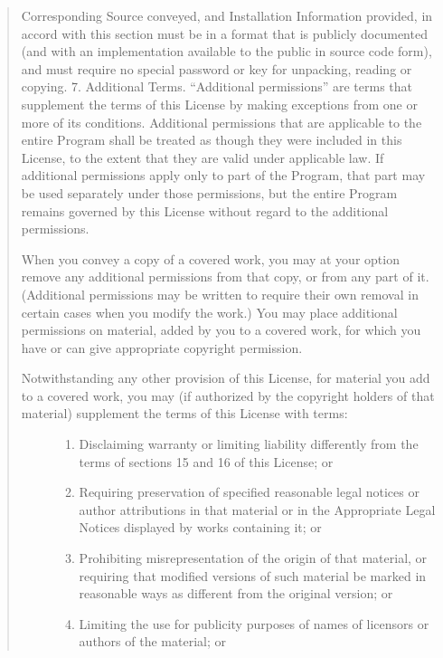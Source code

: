 \documentclass[letterpaper,10pt,english]{sphinxmanual}
\begin{document}
\begin{quote}
Corresponding Source conveyed, and Installation Information provided, in accord with this section must be in a format that is publicly documented (and with an implementation available to the public in source code form), and must require no special password or key for unpacking, reading or copying.
7. Additional Terms.
“Additional permissions” are terms that supplement the terms of this License by making exceptions from one or more of its conditions. Additional permissions that are applicable to the entire Program shall be treated as though they were included in this License, to the extent that they are valid under applicable law. If additional permissions apply only to part of the Program, that part may be used separately under those permissions, but the entire Program remains governed by this License without regard to the additional permissions.

When you convey a copy of a covered work, you may at your option remove any additional permissions from that copy, or from any part of it. (Additional permissions may be written to require their own removal in certain cases when you modify the work.) You may place additional permissions on material, added by you to a covered work, for which you have or can give appropriate copyright permission.
\begin{description}
\item[{Notwithstanding any other provision of this License, for material you add to a covered work, you may (if authorized by the copyright holders of that material) supplement the terms of this License with terms:}] \leavevmode\begin{enumerate}
%
\item {} 
Disclaiming warranty or limiting liability differently from the terms of sections 15 and 16 of this License; or

\item {} 
Requiring preservation of specified reasonable legal notices or author attributions in that material or in the Appropriate Legal Notices displayed by works containing it; or

\item {} 
Prohibiting misrepresentation of the origin of that material, or requiring that modified versions of such material be marked in reasonable ways as different from the original version; or

\item {} 
Limiting the use for publicity purposes of names of licensors or authors of the material; or


\end{enumerate}
\end{description}
\end{quote}
\end{document}
